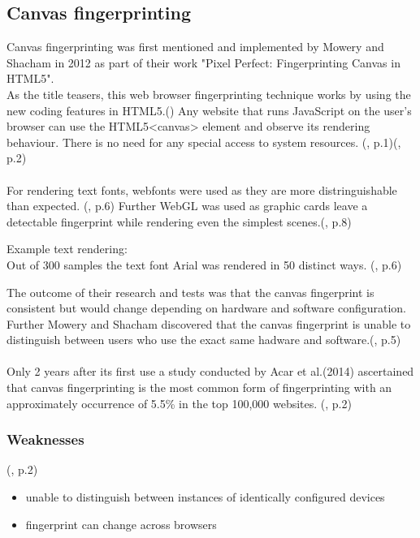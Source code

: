 \subsection{Canvas fingerprinting}
Canvas fingerprinting was first mentioned and implemented by Mowery and Shacham in 2012 as part of their work "Pixel Perfect: Fingerprinting Canvas in HTML5".\\
As the title teasers, this web browser fingerprinting technique works by using the new coding features in HTML5.(\textcite{pixel18}) Any website that runs JavaScript on the user's browser can use the HTML5<canvas> element and observe its rendering behaviour. There is no need for any special access to system resources. (\textcite{mowery12}, p.1)(\textcite{upi15}, p.2)\\\\
For rendering text fonts, webfonts were used as they are more distringuishable than expected. (\textcite{mowery12}, p.6) Further WebGL was used as  graphic cards leave a detectable fingerprint while rendering even the simplest scenes.(\textcite{mowery12}, p.8)\\
\begin{tcolorbox}
	Example text rendering: \\
	Out of 300 samples the text font Arial was rendered in 50 distinct ways. (\textcite{mowery12}, p.6)
\end{tcolorbox}
The outcome of their research and tests was that the canvas fingerprint is consistent but would change depending on hardware and software configuration. Further Mowery and Shacham discovered that the canvas fingerprint is unable to distinguish between users who use the exact same hadware and software.(\textcite{mowery12}, p.5)\\\\
Only 2 years after its first use a study conducted by Acar et al.(2014) ascertained that canvas fingerprinting is the most common form of fingerprinting with an approximately occurrence of 5.5\% in the top 100,000 websites. (\textcite{upi15}, p.2)

\subsubsection{Weaknesses}
(\textcite{upi15}, p.2)
\begin{itemize}
	\item unable to distinguish between instances of identically configured devices
	\item fingerprint can change across browsers
\end{itemize}

